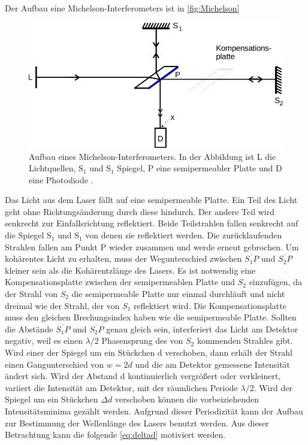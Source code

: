 Der Aufbau eine Michelson-Interferometers ist in \autoref{fig:Michelson}
\begin{figure}[H]
    \centering
    \includegraphics{figures/Abb1.pdf}
    \caption{Aufbau eines Michelson-Interferometers. In der Abbildung ist L die Lichtquellen, $ \textrm{S}_1 $ und $ \textrm{S}_1 $  Spiegel, P eine semipermeabler Platte und D eine Photodiode \cite{ap11}.}
    \label{fig:Michelson}
\end{figure}

Das Licht aus dem Laser fällt auf eine semipermeable Platte. Ein Teil des Licht geht ohne Richtungsänderung durch diese hindurch. Der andere Teil wird senkrecht zur Einfallsrichtung reflektiert. Beide Teilstrahlen fallen  senkrecht auf die Spiegel $ \textrm{S}_1 $ und $ \textrm{S}_1 $ von denen sie reflektiert werden.
Die zurücklaufenden Strahlen fallen am Punkt P wieder zusammen und werde erneut gebrochen. Um kohärentes Licht zu erhalten, muss der Wegunterschied zwischen $\overline{S_1 P}$ und $\overline{S_2 P} $ kleiner sein als die Kohärentzlänge des Lasers.
Es ist notwendig eine Kompensationsplatte zwischen der semipermeablen Platte und $S_2$ einzufügen, da der Strahl von $S_2$ die semipermeable Platte nur einmal durchläuft und nicht dreimal wie der Strahl, der von $S_1$ reflektiert wird. 
Die Kompensationsplatte muss den gleichen Brechungsindex haben wie die semipermeable Platte.
Sollten die Abstände $\overline{S_1 P}$ und $\overline{S_2 P} $ genau gleich sein, interferiert das Licht am Detektor negativ, weil es einen $\lambda /2 $ Phasensprung des von $S_2$ kommenden Strahles gibt. \\

Wird einer der Spiegel um ein Stückchen d verschoben, dann erhält der Strahl einen Gangunterschied von $w = 2d$ und die am Detektor gemessene Intensität ändert sich.
Wird der Abstand d kontinuierlich vergrößert oder verkleinert, variiert die Intensität am Detektor, mit der räumlichen Periode $\lambda / 2$. Wird der Spiegel um ein Stückchen $ \Delta d$ verschoben können die vorbeiziehenden Intensitätsminima gezählt werden.
Aufgrund dieser Periodizität kann der Aufbau zur Bestimmung der Wellenlänge des Lasers benutzt werden. Aus dieser Betrachtung kann die folgende \eqref{eq:deltad} motiviert werden.

